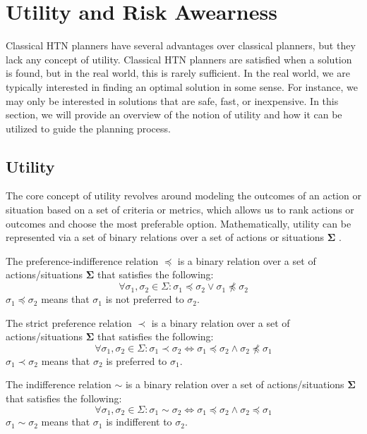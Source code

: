 \section{Utility and Risk Awearness}
\label{sec:utilityAnRisk}

Classical HTN planners have several advantages over classical planners, but they lack any concept of utility. Classical HTN planners are satisfied when a solution is found, but in the real world, this is rarely sufficient. In the real world, we are typically interested in finding an optimal solution in some sense. For instance, we may only be interested in solutions that are safe, fast, or inexpensive. In this section, we will provide an overview of the notion of utility and how it can be utilized to guide the planning process.

\subsection{Utility}
The core concept of utility revolves around modeling the outcomes of an action or situation based on a set of criteria or metrics, which allows us to rank actions or outcomes and choose the most preferable option. Mathematically, utility can be represented via a set of binary relations over a set of actions or situations $\mathbf{\Sigma}$ \cite{fishburn1968utility}.

\begin{Tdef}
    The preference-indifference relation $\preceq$ is a binary relation over a set of actions/situations $\mathbf{\Sigma}$ that satisfies the following:
    $$\forall \sigma_1, \sigma_2 \in \Sigma : \sigma_1 \preceq \sigma_2 \vee \sigma_1 \npreceq \sigma_2$$
    $\sigma_1 \preceq \sigma_2$ means that $\sigma_1$ is not preferred to $\sigma_2$.
\end{Tdef}

\begin{Tdef}
    The strict preference relation $\prec$ is a binary relation over a set of actions/situations $\mathbf{\Sigma}$ that satisfies the following:
    $$\forall \sigma_1, \sigma_2 \in \Sigma : \sigma_1 \prec \sigma_2 \Longleftrightarrow \sigma_1 \preceq \sigma_2 \wedge \sigma_2 \npreceq \sigma_1$$
    $\sigma_1 \prec \sigma_2$ means that $\sigma_2$ is preferred to $\sigma_1$.
\end{Tdef}


\begin{Tdef}
    The indifference relation $\sim$ is a binary relation over a set of actions/situations $\mathbf{\Sigma}$ that satisfies the following:
    $$\forall \sigma_1, \sigma_2 \in \Sigma : \sigma_1 \sim \sigma_2 \Longleftrightarrow \sigma_1 \preceq \sigma_2 \wedge \sigma_2 \preceq \sigma_1$$
    $\sigma_1 \sim \sigma_2$ means that $\sigma_1$ is indifferent to $\sigma_2$.
\end{Tdef}

